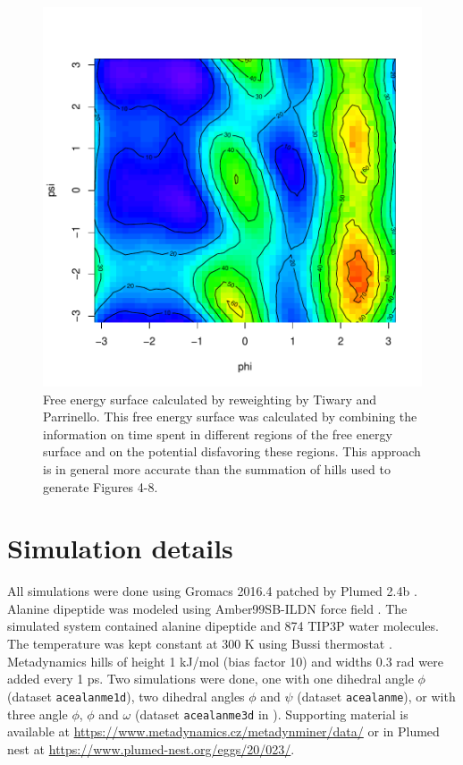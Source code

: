 \begin{Schunk}
\begin{figure}

{\centering \includegraphics[width=0.8\linewidth]{metadynminer_files/figure-latex/rew-1} 

}

\caption[Free energy surface calculated by reweighting by Tiwary and Parrinello]{Free energy surface calculated by reweighting by Tiwary and Parrinello. This free energy surface was calculated by combining the information on time spent in different regions of the free energy surface and on the potential disfavoring these regions. This approach is in general more accurate than the summation of hills used to generate Figures 4-8.}\label{fig:rew}
\end{figure}
\end{Schunk}

\hypertarget{simulation-details}{%
\section{Simulation details}\label{simulation-details}}

All simulations were done using Gromacs 2016.4 \citep{gmx} patched by
Plumed 2.4b \citep{plumed}. Alanine dipeptide was modeled using
Amber99SB-ILDN force field \citep{ildn}. The simulated system contained
alanine dipeptide and 874 TIP3P \citep{tip3p} water molecules. The
temperature was kept constant at 300 K using Bussi thermostat
\citep{vrescale}. Metadynamics hills of height 1 kJ/mol (bias factor 10)
and widths 0.3 rad were added every 1 ps. Two simulations were done, one
with one dihedral angle \(\phi\) (dataset \texttt{acealanme1d}), two
dihedral angles \(\phi\) and \(\psi\) (dataset \texttt{acealanme}), or
with three angle \(\phi\), \(\phi\) and \(\omega\) (dataset
\texttt{acealanme3d} in ). Supporting material
is available at \url{https://www.metadynamics.cz/metadynminer/data/} or
in Plumed nest \citep{nest} at
\url{https://www.plumed-nest.org/eggs/20/023/}.

